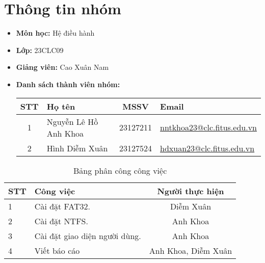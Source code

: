 \section{Thông tin nhóm}
\begin{itemize}
	\item \textbf{Môn học: } Hệ điều hành
	\item \textbf{Lớp: } 23CLC09
	\item \textbf{Giảng viên: } Cao Xuân Nam
	\item \textbf{Danh sách thành viên nhóm: }
	      \begin{center}
		      \renewcommand{\arraystretch}{1.5}
		      \begin{tabular}{|c|l|c|l|}
			      \hline
			      \textbf{STT} & \textbf{Họ tên}       & \textbf{MSSV} & \textbf{Email}                                                        \\\hline
			      1            & Nguyễn Lê Hồ Anh Khoa & 23127211      & \href{mailto:nlhakhoa23@clc.fitus.edu.vn}{nntkhoa23@clc.fitus.edu.vn} \\\hline
			      2            & Hình Diễm Xuân        & 23127524      & \href{mailto:bmduy23@clc.fitus.edu.vn}{hdxuan23@clc.fitus.edu.vn}     \\\hline
		      \end{tabular}
	      \end{center}
\end{itemize}

\begin{center}
  \begin{table}[H]
    \centering
    \caption{Bảng phân công công việc }
    \renewcommand{\arraystretch}{1.4}
    \begin{tabular}{|l|p{}|c|}
      \hline
      \textbf{STT} & \textbf{Công việc}            & \textbf{Người thực hiện} \\ \hline
      1            & Cài đặt FAT32.                & Diễm Xuân                \\ \hline
      2            & Cài đặt NTFS.
                   & Anh Khoa                                                 \\ \hline
      3            & Cài đặt giao diện người dùng.
                   & Anh Khoa                                                 \\ \hline
      4            & Viết báo cáo
                   & Anh Khoa, Diễm Xuân                                      \\ \hline
    \end{tabular}
    \label{tab:mytable}
  \end{table}
\end{center}
